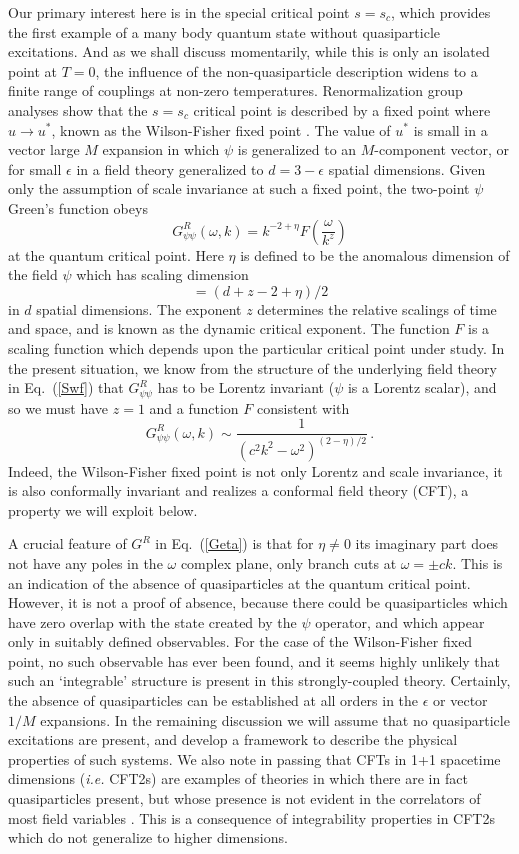 \documentclass[10pt, oneside]{book}
\def\be{\begin{equation}}
\def\ee{\end{equation}}
\begin{document}
\begin{doublespace}
Our primary interest here is in the special critical point $s=s_c$, which provides the first example of a many body quantum state without quasiparticle
excitations. And as we shall discuss momentarily, while this is only an isolated point at $T=0$, the influence of the non-quasiparticle description widens to a finite range of couplings at non-zero temperatures. Renormalization group analyses show that the $s=s_c$ critical point is described
by a fixed point where $u \rightarrow u^\ast$, known as the Wilson-Fisher fixed point \cite{ssbook,WilsonFisher}. 
The value of $u^\ast$ is small in a vector large $M$ expansion in which $\psi$ is generalized to an $M$-component vector, or for small $\epsilon$ in a field theory generalized to $d=3-\epsilon$ spatial dimensions. Given only the assumption of scale invariance at such a fixed point, the two-point $\psi$ Green's function obeys
\be
G^R_{\psi\psi} (\omega, k) = k^{-2 + \eta} F\left(\frac{\omega}{k^z} \right) \label{Gscal}
\ee
at the quantum critical point. Here $\eta$ is defined to be the anomalous dimension of the field $\psi$ which has scaling dimension
\be
[ \psi ] = (d+z-2+\eta)/2
\ee
in $d$ spatial dimensions. The exponent $z$ determines the relative scalings of time and space, and is known as the dynamic critical exponent.
The function $F$ is a scaling function which depends upon the particular critical point under study. In the present situation, we know from the structure
of the underlying field theory in Eq.~(\ref{Swf}) that $G^R_{\psi\psi}$ has to be Lorentz invariant ($\psi$ is a Lorentz scalar), and so we must have $z=1$
and a function $F$ consistent with
\be
G^R_{\psi\psi} (\omega, k) \sim \frac{1}{(c^2k^2 - \omega^2)^{(2 -\eta)/2}} \,. \label{Geta}
\ee
Indeed, the Wilson-Fisher fixed point is not only Lorentz and scale invariance, it is also conformally invariant and realizes a conformal field theory (CFT),
a property we will exploit below.

A crucial feature of $G^R$ in Eq.~(\ref{Geta}) is that for $\eta \neq 0$ 
its imaginary part does not have any poles in the $\omega$ complex plane, only branch cuts at
$\omega = \pm ck$. This is an indication of the absence of quasiparticles at the quantum critical point. However, it is not a proof of absence, because
there could be quasiparticles which have zero overlap with the state created by the $\psi$ operator, and which appear only in suitably defined observables.
For the case of the Wilson-Fisher fixed point, no such observable has ever been found, and it seems highly unlikely that such an `integrable' structure
is present in this strongly-coupled theory. Certainly, the absence of quasiparticles can be established at all orders in the $\epsilon$ or vector $1/M$ expansions. 
In the remaining discussion we will assume that no quasiparticle excitations are present, and develop a framework to describe the physical properties of such
systems. We also note in passing that CFTs in 1+1 spacetime dimensions ({\it i.e.\/} CFT2s) are examples of theories in which
there are in fact quasiparticles present, but whose presence is not evident in the correlators of most field variables \cite{Herzog:2007ij}. This is a consequence of  integrability properties in CFT2s which do not generalize to higher dimensions.


\end{doublespace}
\end{document}
